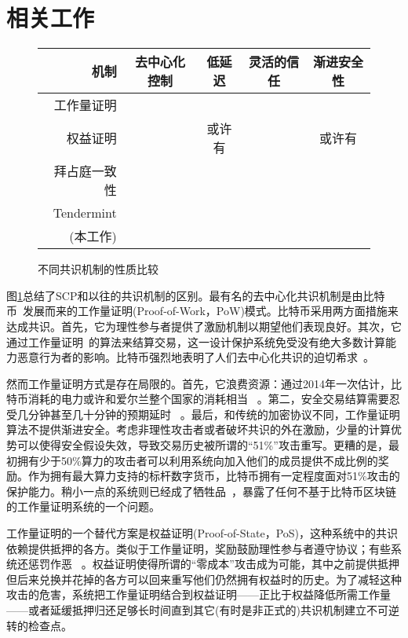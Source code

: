 \section{相关工作}

\begin{figure}
\centering
{}
\begin{tabu}{r<{\quad}cccc}
  \toprule
  \rowfont\bfseries
	机制 &	去中心化控制 &	低延迟 &	灵活的信任 &	渐进安全性\\
	\midrule
	工作量证明 & \checkmark &&& \\
	权益证明 & \checkmark & 或许有 && 或许有	\\
	拜占庭一致性 && \checkmark & \checkmark & \checkmark \\
	Tendermint & \checkmark & \checkmark && \checkmark \\
	{\FBA}(本工作) & \checkmark & \checkmark & \checkmark & \checkmark \\ 
	\bottomrule
\end{tabu}
\caption{不同共识机制的性质比较}
\label{fig:relwk}
\end{figure}


图\ref{fig:relwk}总结了SCP和以往的共识机制的区别。最有名的去中心化共识机制是由比特币~\cite{bitcoin2008}发展而来的工作量证明(Proof-of-Work，PoW)模式。比特币采用两方面措施来达成共识。首先，它为理性参与者提供了激励机制以期望他们表现良好。其次，它通过工作量证明~\cite{Dwork:1992:PVP:646757.705669}的算法来结算交易，这一设计保护系统免受没有绝大多数计算能力恶意行为者的影响。比特币强烈地表明了人们去中心化共识的迫切希求~\cite{Bonneau:2015em}。

然而工作量证明方式是存在局限的。首先，它浪费资源：通过2014年一次估计，比特币消耗的电力或许和爱尔兰整个国家的消耗相当~\cite{6912770} 。第二，安全交易结算需要忍受几分钟甚至几十分钟的预期延时~\cite{Karame:2012jt} 。最后，和传统的加密协议不同，工作量证明算法不提供渐进安全。考虑非理性攻击者或者破坏共识的外在激励，少量的计算优势可以使得安全假设失效，导致交易历史被所谓的``51\%''攻击重写。更糟的是，最初拥有少于50\%算力的攻击者可以利用系统向加入他们的成员提供不成比例的奖励。作为拥有最大算力支持的标杆数字货币，比特币拥有一定程度面对51\%攻击的保护能力。稍小一点的系统则已经成了牺牲品~\cite{attack_bbt2013,attack_cb2013}，暴露了任何不基于比特币区块链的工作量证明系统的一个问题。

工作量证明的一个替代方案是权益证明(Proof-of-State，PoS)，这种系统中的共识依赖提供抵押的各方。类似于工作量证明，奖励鼓励理性参与者遵守协议；有些系统还惩罚作恶~\cite{slasher2014, neucoin2015} 。权益证明使得所谓的``零成本''攻击成为可能，其中之前提供抵押但后来兑换并花掉的各方可以回来重写他们仍然拥有权益时的历史。为了减轻这种攻击的危害，系统把工作量证明结合到权益证明——正比于权益降低所需工作量——或者延缓抵押归还足够长时间直到其它(有时是非正式的)共识机制建立不可逆转的检查点。


